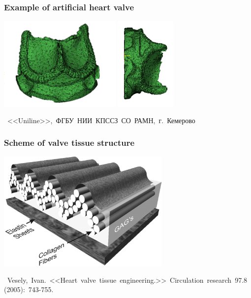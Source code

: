 \documentclass[14pt]{beamer}
\begin{document}
\begin{frame}
\frametitle{Example of artificial heart valve}
    \begin{center}
        \vspace{1.0cm}
        \includegraphics[width=6cm]{real_valve_3_1.png}
        \includegraphics[width=3cm]{real_valve2_1.png}

        \vspace{1.1cm}
        \mbox{\scriptsize
            <<Uniline>>, ФГБУ НИИ КПССЗ СО РАМН, г. Кемерово
        }
    \end{center}
\end{frame}

\begin{frame}
\frametitle{Scheme of valve tissue structure}
    \begin{center}
        \includegraphics[width=8.5cm]{valve_tissue_structure.jpg}
    \end{center}

    \begin{spacing}{0.5}
        \mbox{\scriptsize
            Vesely, Ivan. <<Heart valve tissue engineering.>> Circulation research 97.8 (2005): 743-755.
        }
    \end{spacing}

\end{frame}
\end{document}
